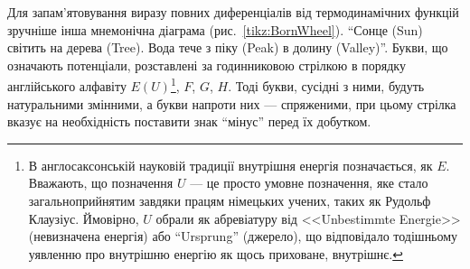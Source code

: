 Для запам'ятовування виразу повних диференціалів від термодинамічних функцій зручніше інша мнемонічна діаграма (рис.~\ref{tikz:BornWheel}). \enquote{Сонце (Sun) світить на дерева (Tree). Вода тече з піку (Peak) в долину (Valley)}. Букви, що означають потенціали, розставлені за годинниковою стрілкою в порядку англійського алфавіту $E(U)$\footnote{ В англосаксонській науковій традиції внутрішня енергія позначається, як $E$. Вважають, що позначення $U$ --- це просто умовне позначення, яке стало загальноприйнятим завдяки працям німецьких учених, таких як Рудольф Клаузіус. Ймовірно, $U$ обрали як абревіатуру від <<Unbestimmte Energie>> (невизначена енергія) або \enquote{Ursprung} (джерело), що відповідало тодішньому уявленню про внутрішню енергію як щось приховане, внутрішнє.}, $F$, $G$, $H$. Тоді букви, сусідні з ними, будуть натуральними змінними, а букви напроти них --- спряженими, при цьому стрілка вказує на необхідність поставити знак \enquote{мінус} перед їх добутком.

